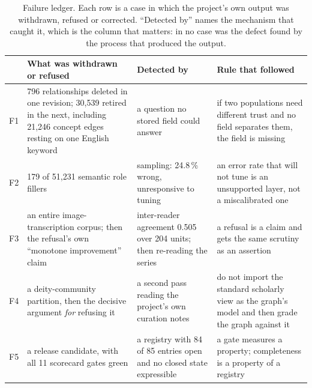 \begin{table}[tb]
\centering
\caption{Failure ledger. Each row is a case in which the project's own output was
withdrawn, refused or corrected. ``Detected by'' names the mechanism that caught it,
which is the column that matters: in no case was the defect found by the process that
produced the output.}
\label{tab:failures}
\footnotesize
\begin{tabularx}{\linewidth}{@{}l>{\raggedright\arraybackslash}X
                             >{\raggedright\arraybackslash}p{27mm}
                             >{\raggedright\arraybackslash}X@{}}
\toprule
& What was withdrawn or refused & Detected by & Rule that followed \\
\midrule

F1 & 41{,}796 relationships deleted in one revision; 30{,}539 retired in the next,
     including 21{,}246 concept edges resting on one English keyword
   & a question no stored field could answer
   & if two populations need different trust and no field separates them, the field
     is missing \\

F2 & 49{,}179 of 51{,}231 semantic role fillers
   & sampling: 24.8\,\% wrong, unresponsive to tuning
   & an error rate that will not tune is an unsupported layer, not a
     miscalibrated one \\

F3 & an entire image-transcription corpus; then the refusal's own ``monotone
     improvement'' claim
   & inter-reader agreement 0.505 over 204 units; then re-reading the series
   & a refusal is a claim and gets the same scrutiny as an assertion \\

F4 & a deity-community partition, then the decisive argument \emph{for} refusing it
   & a second pass reading the project's own curation notes
   & do not import the standard scholarly view as the graph's model and then grade
     the graph against it \\

F5 & a release candidate, with all 11 scorecard gates green
   & a registry with 84 of 85 entries open and no closed state expressible
   & a gate measures a property; completeness is a property of a registry \\


\end{tabularx}
\end{table}
